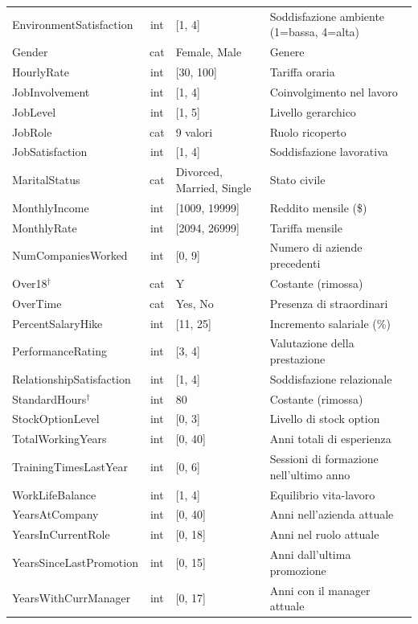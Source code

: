 \begin{longtable}{p{4.2cm} c p{3.2cm} p{4.5cm}}
    EnvironmentSatisfaction & int & [1, 4] & Soddisfazione ambiente (1=bassa, 4=alta) \\
    Gender & cat & Female, Male & Genere \\
    HourlyRate & int & [30, 100] & Tariffa oraria \\
    JobInvolvement & int & [1, 4] & Coinvolgimento nel lavoro \\
    JobLevel & int & [1, 5] & Livello gerarchico \\
    JobRole & cat & 9 valori & Ruolo ricoperto \\
    JobSatisfaction & int & [1, 4] & Soddisfazione lavorativa \\
    MaritalStatus & cat & Divorced, Married, Single & Stato civile \\
    MonthlyIncome & int & [1009, 19999] & Reddito mensile (\$) \\
    MonthlyRate & int & [2094, 26999] & Tariffa mensile \\
    NumCompaniesWorked & int & [0, 9] & Numero di aziende precedenti \\
    Over18$^\dagger$ & cat & Y & Costante (rimossa) \\
    OverTime & cat & Yes, No & Presenza di straordinari \\
    PercentSalaryHike & int & [11, 25] & Incremento salariale (\%) \\
    PerformanceRating & int & [3, 4] & Valutazione della prestazione \\
    RelationshipSatisfaction & int & [1, 4] & Soddisfazione relazionale \\
    StandardHours$^\dagger$ & int & 80 & Costante (rimossa) \\
    StockOptionLevel & int & [0, 3] & Livello di stock option \\
    TotalWorkingYears & int & [0, 40] & Anni totali di esperienza \\
    TrainingTimesLastYear & int & [0, 6] & Sessioni di formazione nell'ultimo anno \\
    WorkLifeBalance & int & [1, 4] & Equilibrio vita-lavoro \\
    YearsAtCompany & int & [0, 40] & Anni nell'azienda attuale \\
    YearsInCurrentRole & int & [0, 18] & Anni nel ruolo attuale \\
    YearsSinceLastPromotion & int & [0, 15] & Anni dall'ultima promozione \\
    YearsWithCurrManager & int & [0, 17] & Anni con il manager attuale \\
\end{longtable}

